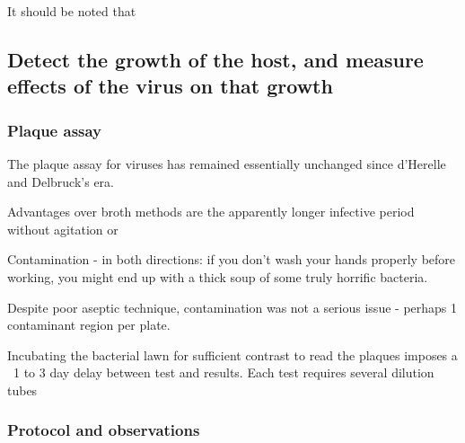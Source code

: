 \documentclass[paper.tex]{subfiles}
\begin{document}
It should be noted that 

\subsection{Detect the growth of the host, and measure effects of the virus on that growth}

\subsubsection{Plaque assay}

The plaque assay for viruses has remained essentially unchanged since d'Herelle and Delbruck's era.

Advantages over broth methods are the apparently longer infective period without agitation or 

Contamination - in both directions: if you don’t wash your hands properly before working, you might end up with a thick soup of some truly horrific bacteria.

Despite poor aseptic technique, contamination was not a serious issue - perhaps 1 contaminant region per plate.

Incubating the bacterial lawn for sufficient contrast to read the plaques imposes a ~1 to 3 day delay between test and results. Each test requires several dilution tubes

\subsubsection{Protocol and observations}
\end{document}
